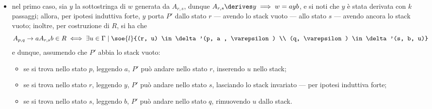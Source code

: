 \documentclass[a4paper, 12pt]{report}
\begin{document}
{\begin{enumerate}[label=]
\begin{enumerate}[label=]
                        \begin{itemize}
                            \item nel primo caso, sia $y$ la sottostringa di $w$ generata da $A_{r,s}$, dunque $A_{r,s} \derives y \implies w = ayb$, e si noti che $y$ è stata derivata con $k$ passaggi; allora, per ipotesi induttiva forte, $y$ porta $P'$ dallo stato $r$ --- avendo lo stack vuoto --- allo stato $s$ --- avendo ancora lo stack vuoto; inoltre, per costruzione di $R$, si ha che $$A_{p,q} \to a A_{r,s}b \in R \iff \exists u \in \Gamma \mid \soe{l}{(r, u) \in \delta'(p, a , \varepsilon) \\ (q, \varepsilon) \in \delta'(s, b, u)}$$ e dunque, assumendo che $P'$ abbia lo stack vuoto:
                                
                                \begin{itemize}
                                    \item se si trova nello stato $p$, leggendo $a$, $P'$ può andare nello stato $r$, inserendo $u$ nello stack;
                                    \item se si trova nello stato $r$, leggendo $y$, $P'$ può andare nello stato $s$, lasciando lo stack invariato --- per ipotesi induttiva forte;
                                    \item se si trova nello stato $s$, leggendo $b$, $P'$ può andare nello stato $q$, rimuovendo $u$ dallo stack.
                                \end{itemize}


\end{itemize}
\end{enumerate}
\end{enumerate}}
\end{document}
